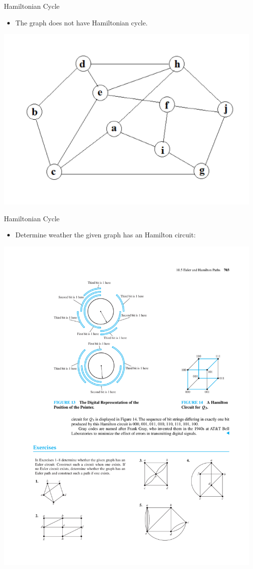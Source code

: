 \documentclass{beamer}
\theoremstyle{definition}
\begin{document}
\begin{frame}{Hamiltonian Cycle}
    \begin{itemize}
        \item The graph does not have Hamiltonian cycle.
    \end{itemize}
    \centering \includegraphics[width=.7\linewidth]{p1.jpg}
\end{frame}

\begin{frame}{Hamiltonian Cycle}
   \begin{itemize}
        \item Determine weather the given graph has an Hamilton circuit:
    \end{itemize}
    \centering \includegraphics[trim={12.2cm 6cm 6cm 18.2cm},clip,width=.45\linewidth]{p703}
\end{frame}
\end{document}

